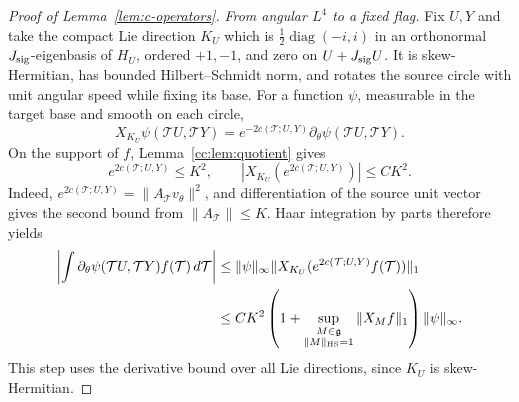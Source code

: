 \documentclass[11pt]{article}
\numberwithin{equation}{section}
\theoremstyle{remark}
\newcommand{\diag}{\operatorname{diag}}
\begin{document}
\begin{proof}[Proof of Lemma~\ref{lem:c-operators}]
\medskip\noindent\emph{From angular $L^4$ to a fixed flag.}
Fix $U,Y$ and take the compact Lie direction $K_U$ which is
$\frac12\diag(-i,i)$ in an orthonormal $J_{\rm sig}$-eigenbasis of
$H_U$, ordered $+1,-1$, and zero on $U+J_{\rm sig}U$. It is skew-Hermitian, has bounded
Hilbert--Schmidt norm, and rotates the source circle with unit
angular speed while fixing its base. For a function $\psi$,
measurable in the target base and smooth on each circle,
\[
 X_{K_U}\psi(\mathcal T U,\mathcal T Y)=e^{-2c(\mathcal T;U,Y)}\partial_\theta\psi(\mathcal T U,\mathcal T Y).
\]
On the support of $f$, Lemma~\ref{cc:lem:quotient} gives
\[
 e^{2c(\mathcal T;U,Y)}\le K^2,\qquad
 |X_{K_U}(e^{2c(\mathcal T;U,Y)})|\le CK^2.
\]
Indeed, $e^{2c(\mathcal T;U,Y)}=\|A_{\mathcal T}v_\theta\|^2$, and differentiation of the
source unit vector gives the second bound from $\|A_{\mathcal T}\|\le K$.
Haar integration by parts therefore yields
\begin{equation}\label{cc:eq:vertical}
 \begin{aligned}
 \left|\int\partial_\theta\psi(\mathcal T U,\mathcal T Y)f(\mathcal T)\,d\mathcal T\right|
 &\le\|\psi\|_\infty\|X_{K_U}(e^{2c(\mathcal T;U,Y)}f(\mathcal T))\|_1\\
 &\le CK^2\left(1+
 \sup_{\substack{M\in\mathfrak g\\\|M\|_{\rm HS}=1}}
                \|X_Mf\|_1\right)\|\psi\|_\infty.
 \end{aligned}
\end{equation}
This step uses the derivative bound over all Lie directions, since
$K_U$ is skew-Hermitian.


\end{proof}
\end{document}
